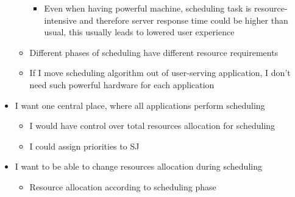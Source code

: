 \begin{itemize}
\begin{itemize}
\begin{itemize}
            \item Even when having powerful machine, scheduling task is resource-intensive and therefore server response time could be higher than usual, this
            usually leads to lowered user experience
        \end{itemize}
        \item Different phases of scheduling have different resource requirements
        \item If I move scheduling algorithm out of user-serving application, I don't need such powerful hardware for each application
    \end{itemize}
    \item I want one central place, where all applications perform scheduling
    \begin{itemize}
        \item I would have control over total resources allocation for scheduling
        \item I could assign priorities to SJ
    \end{itemize}
    \item I want to be able to change resources allocation during scheduling
    \begin{itemize}
        \item Resource allocation according to scheduling phase
    \end{itemize}
\end{itemize}

















































